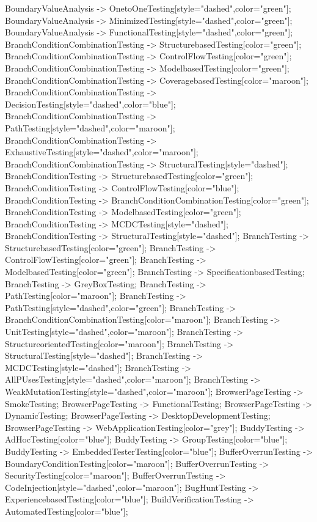 \documentclass{article}
\begin{document}
{BoundaryValueAnalysis -> OnetoOneTesting[style="dashed",color="green"];
BoundaryValueAnalysis -> MinimizedTesting[style="dashed",color="green"];
BoundaryValueAnalysis -> FunctionalTesting[style="dashed",color="green"];
BranchConditionCombinationTesting -> StructurebasedTesting[color="green"];
BranchConditionCombinationTesting -> ControlFlowTesting[color="green"];
BranchConditionCombinationTesting -> ModelbasedTesting[color="green"];
BranchConditionCombinationTesting -> CoveragebasedTesting[color="maroon"];
BranchConditionCombinationTesting -> DecisionTesting[style="dashed",color="blue"];
BranchConditionCombinationTesting -> PathTesting[style="dashed",color="maroon"];
BranchConditionCombinationTesting -> ExhaustiveTesting[style="dashed",color="maroon"];
BranchConditionCombinationTesting -> StructuralTesting[style="dashed"];
BranchConditionTesting -> StructurebasedTesting[color="green"];
BranchConditionTesting -> ControlFlowTesting[color="blue"];
BranchConditionTesting -> BranchConditionCombinationTesting[color="green"];
BranchConditionTesting -> ModelbasedTesting[color="green"];
BranchConditionTesting -> MCDCTesting[style="dashed"];
BranchConditionTesting -> StructuralTesting[style="dashed"];
BranchTesting -> StructurebasedTesting[color="green"];
BranchTesting -> ControlFlowTesting[color="green"];
BranchTesting -> ModelbasedTesting[color="green"];
BranchTesting -> SpecificationbasedTesting;
BranchTesting -> GreyBoxTesting;
BranchTesting -> PathTesting[color="maroon"];
BranchTesting -> PathTesting[style="dashed",color="green"];
BranchTesting -> BranchConditionCombinationTesting[color="maroon"];
BranchTesting -> UnitTesting[style="dashed",color="maroon"];
BranchTesting -> StructureorientedTesting[color="maroon"];
BranchTesting -> StructuralTesting[style="dashed"];
BranchTesting -> MCDCTesting[style="dashed"];
BranchTesting -> AllPUsesTesting[style="dashed",color="maroon"];
BranchTesting -> WeakMutationTesting[style="dashed",color="maroon"];
BrowserPageTesting -> SmokeTesting;
BrowserPageTesting -> FunctionalTesting;
BrowserPageTesting -> DynamicTesting;
BrowserPageTesting -> DesktopDevelopmentTesting;
BrowserPageTesting -> WebApplicationTesting[color="grey"];
BuddyTesting -> AdHocTesting[color="blue"];
BuddyTesting -> GroupTesting[color="blue"];
BuddyTesting -> EmbeddedTesterTesting[color="blue"];
BufferOverrunTesting -> BoundaryConditionTesting[color="maroon"];
BufferOverrunTesting -> SecurityTesting[color="maroon"];
BufferOverrunTesting -> CodeInjection[style="dashed",color="maroon"];
BugHuntTesting -> ExperiencebasedTesting[color="blue"];
BuildVerificationTesting -> AutomatedTesting[color="blue"];
}
\end{document}
